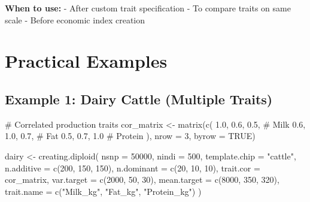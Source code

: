 \documentclass[
  letterpaper,
]{book}
\newenvironment{Shaded}{\begin{snugshade}}{\end{snugshade}}
\newcommand{\AttributeTok}[1]{\textcolor[rgb]{0.40,0.45,0.13}{#1}}
\newcommand{\CommentTok}[1]{\textcolor[rgb]{0.37,0.37,0.37}{#1}}
\newcommand{\ConstantTok}[1]{\textcolor[rgb]{0.56,0.35,0.01}{#1}}
\newcommand{\DecValTok}[1]{\textcolor[rgb]{0.68,0.00,0.00}{#1}}
\newcommand{\FloatTok}[1]{\textcolor[rgb]{0.68,0.00,0.00}{#1}}
\newcommand{\FunctionTok}[1]{\textcolor[rgb]{0.28,0.35,0.67}{#1}}
\newcommand{\NormalTok}[1]{\textcolor[rgb]{0.00,0.23,0.31}{#1}}
\newcommand{\OtherTok}[1]{\textcolor[rgb]{0.00,0.23,0.31}{#1}}
\newcommand{\StringTok}[1]{\textcolor[rgb]{0.13,0.47,0.30}{#1}}
\begin{document}
\textbf{When to use:} - After custom trait specification - To compare
traits on same scale - Before economic index creation

\section{Practical Examples}\label{sec-examples-traits}

\subsection{Example 1: Dairy Cattle (Multiple
Traits)}\label{example-1-dairy-cattle-multiple-traits}

\begin{Shaded}
\begin{Highlighting}[]
\CommentTok{\# Correlated production traits}
\NormalTok{cor\_matrix }\OtherTok{\textless{}{-}} \FunctionTok{matrix}\NormalTok{(}\FunctionTok{c}\NormalTok{(}
  \FloatTok{1.0}\NormalTok{,  }\FloatTok{0.6}\NormalTok{,  }\FloatTok{0.5}\NormalTok{,   }\CommentTok{\# Milk}
  \FloatTok{0.6}\NormalTok{,  }\FloatTok{1.0}\NormalTok{,  }\FloatTok{0.7}\NormalTok{,   }\CommentTok{\# Fat}
  \FloatTok{0.5}\NormalTok{,  }\FloatTok{0.7}\NormalTok{,  }\FloatTok{1.0}    \CommentTok{\# Protein}
\NormalTok{), }\AttributeTok{nrow =} \DecValTok{3}\NormalTok{, }\AttributeTok{byrow =} \ConstantTok{TRUE}\NormalTok{)}

\NormalTok{dairy }\OtherTok{\textless{}{-}} \FunctionTok{creating.diploid}\NormalTok{(}
  \AttributeTok{nsnp =} \DecValTok{50000}\NormalTok{,}
  \AttributeTok{nindi =} \DecValTok{500}\NormalTok{,}
  \AttributeTok{template.chip =} \StringTok{"cattle"}\NormalTok{,}
  \AttributeTok{n.additive =} \FunctionTok{c}\NormalTok{(}\DecValTok{200}\NormalTok{, }\DecValTok{150}\NormalTok{, }\DecValTok{150}\NormalTok{),}
  \AttributeTok{n.dominant =} \FunctionTok{c}\NormalTok{(}\DecValTok{20}\NormalTok{, }\DecValTok{10}\NormalTok{, }\DecValTok{10}\NormalTok{),}
  \AttributeTok{trait.cor =}\NormalTok{ cor\_matrix,}
  \AttributeTok{var.target =} \FunctionTok{c}\NormalTok{(}\DecValTok{2000}\NormalTok{, }\DecValTok{50}\NormalTok{, }\DecValTok{30}\NormalTok{),}
  \AttributeTok{mean.target =} \FunctionTok{c}\NormalTok{(}\DecValTok{8000}\NormalTok{, }\DecValTok{350}\NormalTok{, }\DecValTok{320}\NormalTok{),}
  \AttributeTok{trait.name =} \FunctionTok{c}\NormalTok{(}\StringTok{"Milk\_kg"}\NormalTok{, }\StringTok{"Fat\_kg"}\NormalTok{, }\StringTok{"Protein\_kg"}\NormalTok{)}
\NormalTok{)}
\end{Highlighting}
\end{Shaded}
\end{document}
